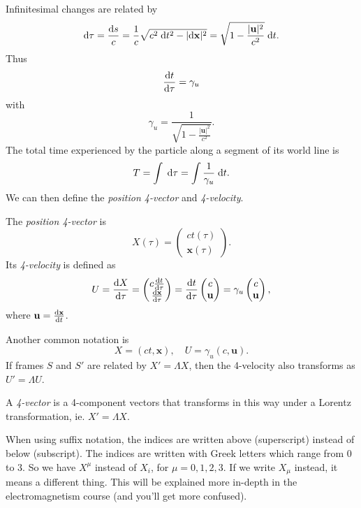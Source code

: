 \documentclass[a4paper]{article}
\begin{document}
Infinitesimal changes are related by
\[
  \mathrm{d} \tau = \frac{\mathrm{d} s}{c} = \frac{1}{c}\sqrt{c^2\;\mathrm{d} t^2 - |\mathrm{d} \mathbf{x}|^2} = \sqrt{1 - \frac{|\mathbf{u}|^2}{c^2}}\;\mathrm{d} t.
\]
Thus
\[
  \frac{\mathrm{d} t}{\mathrm{d} \tau} = \gamma_u
\]
with
\[
  \gamma_u = \frac{1}{\sqrt{1 - \frac{|\mathbf{u}|^2}{c^2}}}.
\]
The total time experienced by the particle along a segment of its world line is
\[
  T = \int \;\mathrm{d} \tau = \int\frac{1}{\gamma_u}\;\mathrm{d} t.
\]
We can then define the \emph{position 4-vector} and \emph{4-velocity}.
\begin{defi}
  The \emph{position 4-vector} is
  \[
    X(\tau) =
    \begin{pmatrix}
      ct(\tau)\\
      \mathbf{x}(\tau)
    \end{pmatrix}.
  \]
  Its \emph{4-velocity} is defined as
  \[
    U = \frac{\mathrm{d} X}{\mathrm{d} \tau} =
    \begin{pmatrix}
      c\frac{\mathrm{d} t}{\mathrm{d} \tau}\\
      \frac{\mathrm{d} \mathbf{x}}{\mathrm{d} \tau}
    \end{pmatrix}
    = \frac{\mathrm{d} t}{\mathrm{d} \tau}
    \begin{pmatrix}
      c\\
      \mathbf{u}
    \end{pmatrix} = \gamma_u
    \begin{pmatrix}
      c\\
      \mathbf{u}
    \end{pmatrix},
  \]
  where $\mathbf{u} = \frac{\mathrm{d} \mathbf{x}}{\mathrm{d} t}$.
\end{defi}
Another common notation is
\[
  X = (ct, \mathbf{x}),\quad U = \gamma_u (c, \mathbf{u}).
\]
If frames $S$ and $S'$ are related by $X' = \Lambda X$, then the 4-velocity also transforms as $U' = \Lambda U$.

\begin{defi}[4-vector]
  A \emph{4-vector} is a 4-component vectors that transforms in this way under a Lorentz transformation, ie. $X' = \Lambda X$.

  When using suffix notation, the indices are written above (superscript) instead of below (subscript). The indices are written with Greek letters which range from $0$ to $3$. So we have $X^\mu$ instead of $X_i$, for $\mu = 0, 1, 2, 3$. If we write $X_\mu$ instead, it means a different thing. This will be explained more in-depth in the electromagnetism course (and you'll get more confused).
\end{defi}
\end{document}
